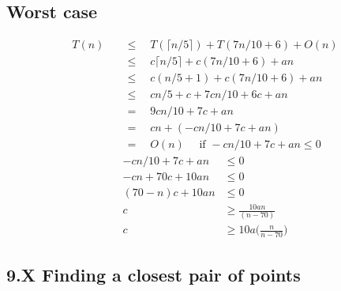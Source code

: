 \documentclass[a4paper]{article}
\begin{document}
\subsection*{Worst case}
\begin{align*}
    T(n)\quad&\leq \quad T(\lceil n/5\rceil)+T(7n/10+6)+O(n)\\
    &\leq \quad c\lceil n/5\rceil+c(7n/10+6)+an\\
    &\leq \quad c(n/5+1)+c(7n/10+6)+an\\
    &\leq \quad cn/5+c+7cn/10+6c+an\\
    &=\quad 9cn/10+7c+an\\
    &=\quad cn+(-cn/10+7c+an)\\
    &=\quad O(n)\quad \text{ if }-cn/10+7c+an\leq 0
\end{align*}
\begin{align*}
    -cn/10+7c+an&\leq 0\\
    -cn+70c+10an&\leq 0\\
    (70-n)c+10an&\leq 0\\
    c&\geq \frac{10an}{(n-70)}\\
    c&\geq 10a\Big(\frac{n}{n-70}\Big)
\end{align*}
\subsection*{9.X Finding a closest pair of points}
\end{document}
